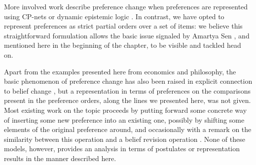 More involved work \cite{CadilhacALB15} describe preference change when 
preferences are represented using CP-nets \cite{BoutilierBDHP04}
or dynamic epistemic logic \cite{BenthemL14}.
In contrast, we have opted to represent preferences as 
strict partial orders over a set of items: we believe this straightforward 
formulation allows the basic issue signaled by Amartya Sen \cite{Sen77},
and mentioned here in the beginning of the chapter, to be visible 
and tackled head on.

Apart from the examples presented here from economics and philosophy,
the basic phenomenon of preference change has also been raised
in explicit connection to belief change \cite{Hansson95,Grune-YanoffH09a,Grune-Yanoff13},
but a representation in terms of preferences on the comparisons present in 
the preference orders, along the lines we presented here, was not given.
Most existing work on the topic proceeds by putting forward some concrete
way of inserting some new preference into an existing one, 
possibly by shifting some elements of the original preference around,
and occasionally with a remark on the similarity between this operation
and a belief revision operation \cite{Freund04,ChomickiS05,Liu11,MaBL12}. 
None of these models, however,
provides an analysis in terms of postulates or representation results 
in the manner described here.
















